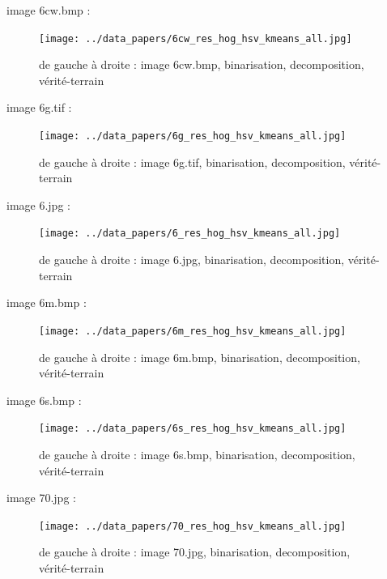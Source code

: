 \documentclass{book}
\begin{document}
image 6cw.bmp : 
\begin{figure}[H]
\begin{center}
\texttt{[image: ../data\_papers/6cw\_res\_hog\_hsv\_kmeans\_all.jpg]}
\end{center}
\caption{de gauche à droite : image 6cw.bmp, binarisation, decomposition, vérité-terrain}
\label{6cw}
\end{figure}
\clearpage


image 6g.tif : 
\begin{figure}[H]
\begin{center}
\texttt{[image: ../data\_papers/6g\_res\_hog\_hsv\_kmeans\_all.jpg]}
\end{center}
\caption{de gauche à droite : image 6g.tif, binarisation, decomposition, vérité-terrain}
\label{6g}
\end{figure}
\clearpage


image 6.jpg : 
\begin{figure}[H]
\begin{center}
\texttt{[image: ../data\_papers/6\_res\_hog\_hsv\_kmeans\_all.jpg]}
\end{center}
\caption{de gauche à droite : image 6.jpg, binarisation, decomposition, vérité-terrain}
\label{6}
\end{figure}
\clearpage


image 6m.bmp : 
\begin{figure}[H]
\begin{center}
\texttt{[image: ../data\_papers/6m\_res\_hog\_hsv\_kmeans\_all.jpg]}
\end{center}
\caption{de gauche à droite : image 6m.bmp, binarisation, decomposition, vérité-terrain}
\label{6m}
\end{figure}
\clearpage


image 6s.bmp : 
\begin{figure}[H]
\begin{center}
\texttt{[image: ../data\_papers/6s\_res\_hog\_hsv\_kmeans\_all.jpg]}
\end{center}
\caption{de gauche à droite : image 6s.bmp, binarisation, decomposition, vérité-terrain}
\label{6s}
\end{figure}
\clearpage


image 70.jpg : 
\begin{figure}[H]
\begin{center}
\texttt{[image: ../data\_papers/70\_res\_hog\_hsv\_kmeans\_all.jpg]}
\end{center}
\caption{de gauche à droite : image 70.jpg, binarisation, decomposition, vérité-terrain}
\label{70}
\end{figure}
\clearpage
\end{document}
